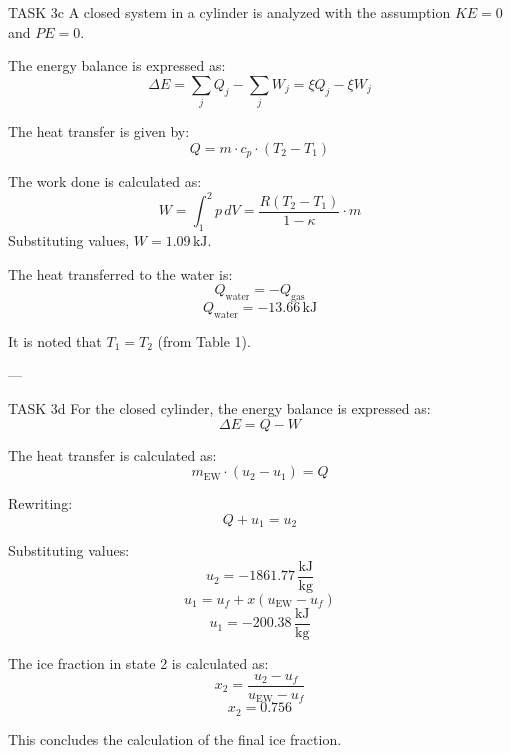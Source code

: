 TASK 3c  
A closed system in a cylinder is analyzed with the assumption \( KE = 0 \) and \( PE = 0 \).  

The energy balance is expressed as:  
\[
\Delta E = \sum_j Q_j - \sum_j W_j = \xi Q_j - \xi W_j
\]  

The heat transfer is given by:  
\[
Q = m \cdot c_p \cdot (T_2 - T_1)
\]  

The work done is calculated as:  
\[
W = \int_1^2 p \, dV = \frac{R(T_2 - T_1)}{1 - \kappa} \cdot m
\]  
Substituting values, \( W = 1.09 \, \text{kJ} \).  

The heat transferred to the water is:  
\[
Q_{\text{water}} = -Q_{\text{gas}}
\]  
\[
Q_{\text{water}} = -13.66 \, \text{kJ}
\]  

It is noted that \( T_1 = T_2 \) (from Table 1).  

---

TASK 3d  
For the closed cylinder, the energy balance is expressed as:  
\[
\Delta E = Q - W
\]  

The heat transfer is calculated as:  
\[
m_{\text{EW}} \cdot (u_2 - u_1) = Q
\]  

Rewriting:  
\[
Q + u_1 = u_2
\]  

Substituting values:  
\[
u_2 = -1861.77 \, \frac{\text{kJ}}{\text{kg}}
\]  
\[
u_1 = u_f + x(u_{\text{EW}} - u_f)
\]  
\[
u_1 = -200.38 \, \frac{\text{kJ}}{\text{kg}}
\]  

The ice fraction in state 2 is calculated as:  
\[
x_2 = \frac{u_2 - u_f}{u_{\text{EW}} - u_f}
\]  
\[
x_2 = 0.756
\]  

This concludes the calculation of the final ice fraction.